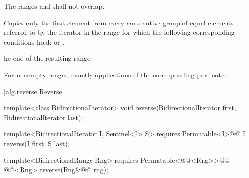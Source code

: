\begin{itemdescr}
\pnum
\requires
{}
The ranges
and
shall not overlap. 

\pnum
\effects
Copies only the first element from every consecutive group of equal elements referred to by
the iterator
in the range
for which the following corresponding conditions hold:
or
.

\pnum
\returns
{}he end of the resulting range.

\pnum
\complexity
For nonempty ranges, exactly
applications of the corresponding predicate.
\end{itemdescr}

[alg.reverse]{Reverse}

%
\begin{removedblock}
\begin{itemdecl}
template<class BidirectionalIterator>
  void reverse(BidirectionalIterator first, BidirectionalIterator last);
\end{itemdecl}
\end{removedblock}
\begin{addedblock}
\begin{itemdecl}
template<BidirectionalIterator I, Sentinel<I> S>
  requires Permutable<I>@\newtxt{()}@
  I reverse(I first, S last);

template<BidirectionalRange Rng>
  requires Permutable<@@<Rng>>@\newtxt{()}@
  @@<Rng>
    reverse(Rng&@\newtxt{\&}@ rng);
\end{itemdecl}
\end{addedblock}

